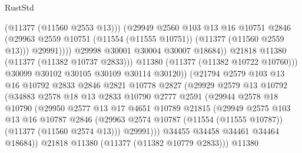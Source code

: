 \begin{lexlean}{RustStd}
\begin{coremodule}
                                  (@11377 (@11560 @2553 @13)))
                                (@29949
                                  @2560
                                  @103
                                  @13
                                  @16
                                  @10751
                                  @2846
                                  (@29963
                                    @2559
                                    @10751
                                    (@11554 (@11555 @10751))
                                    (@11377 (@11560 @2559 @13)))
                                  @29991))))
                          @29998
                          @30001
                          @30004
                          @30007
                          @18684))
                      @21818
                      @11380
                      (@11377 (@11382 @10737 @2833)))
                    @11380
                    (@11377 (@11382 @10722 @10760)))
                  @30099
                  @30102
                  @30105
                  @30109
                  @30114
                  @30120))
              (@21794
                @2579
                @103
                @13
                @16
                @10792
                @2833
                @2846
                @2821
                @10778
                @2827
                (@29929
                  @2579
                  @13
                  @10792
                  (@34883
                    @2578
                    @18
                    @13
                    @2833
                    @10790
                    @2777
                    @2591
                    (@29944
                      @2578
                      @18
                      @10790
                      (@29950
                        @2577
                        @13
                        @17
                        @4651
                        @10789
                        @21815
                        (@29949
                          @2575
                          @103
                          @13
                          @16
                          @10787
                          @2846
                          (@29963 @2574 @10787 (@11554 (@11555 @10787)) (@11377 (@11560 @2574 @13)))
                          @29991)))
                    @34455
                    @34458
                    @34461
                    @34464
                    @18684))
                @21818
                @11380
                (@11377 (@11382 @10779 @2833)))
              @11380

\end{coremodule}
\end{lexlean}
